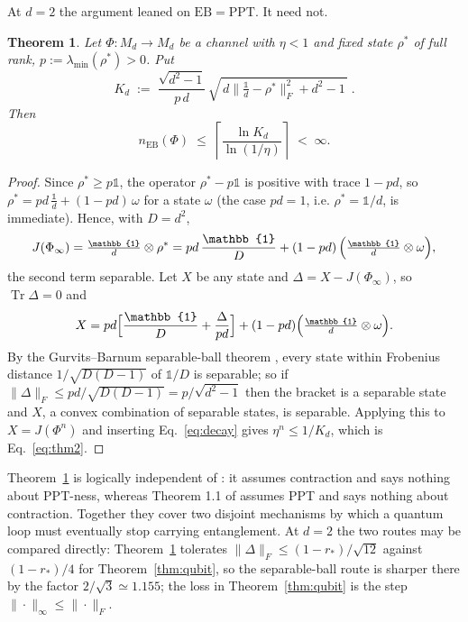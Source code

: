 \documentclass[11pt,a4paper]{article}
\newtheorem{theorem}{Theorem}[section]
\theoremstyle{definition}
\theoremstyle{remark}
\newcommand{\openone}{\mathbb{1}}%
\begin{document}
At $d=2$ the argument leaned on $\mathrm{EB}=\mathrm{PPT}$. It need not.

\begin{theorem}\label{thm:generald}
Let $\Phi:M_d\to M_d$ be a channel with $\eta<1$ and fixed state $\rho^\ast$ of
full rank, $p:=\lambda_{\min}(\rho^\ast)>0$. Put
\begin{equation}\label{eq:Kd}
  K_d \;:=\; \frac{\sqrt{d^{2}-1}}{p\,d}\,
    \sqrt{\,d\bigl\|\tfrac{\openone}{d}-\rho^\ast\bigr\|_F^{2}+d^{2}-1\,}\;.
\end{equation}
Then
\begin{equation}\label{eq:thm2}
  n_{\mathrm{EB}}(\Phi)\;\le\;
  \left\lceil \frac{\ln K_d}{\ln(1/\eta)} \right\rceil \;<\;\infty .
\end{equation}
\end{theorem}

\begin{proof}
Since $\rho^\ast\ge p\openone$, the operator $\rho^\ast-p\openone$ is positive
with trace $1-pd$, so $\rho^\ast=pd\,\tfrac{\openone}{d}+(1-pd)\,\omega$ for a
state $\omega$ (the case $pd=1$, i.e. $\rho^\ast=\openone/d$, is immediate).
Hence, with $D=d^{2}$,
\begin{equation}
  J(\Phi_\infty)=\tfrac{\openone}{d}\otimes\rho^\ast
  = pd\,\frac{\openone}{D}+(1-pd)\,\Bigl(\tfrac{\openone}{d}\otimes\omega\Bigr),
\end{equation}
the second term separable. Let $X$ be any state and
$\Delta=X-J(\Phi_\infty)$, so $\operatorname{Tr}\Delta=0$ and
\begin{equation}
  X = pd\Bigl[\frac{\openone}{D}+\frac{\Delta}{pd}\Bigr]
      +(1-pd)\Bigl(\tfrac{\openone}{d}\otimes\omega\Bigr).
\end{equation}
By the Gurvits--Barnum separable-ball theorem \cite{GurvitsBarnum02}, every
state within Frobenius distance $1/\sqrt{D(D-1)}$ of $\openone/D$ is separable;
so if $\|\Delta\|_F\le pd/\sqrt{D(D-1)}=p/\sqrt{d^{2}-1}$ then the bracket is a
separable state and $X$, a convex combination of separable states, is separable.
Applying this to $X=J(\Phi^{n})$ and inserting Eq.~\eqref{eq:decay} gives
$\eta^{n}\le 1/K_d$, which is Eq.~\eqref{eq:thm2}.
\end{proof}

Theorem~\ref{thm:generald} is logically independent of \cite{Park2026}: it
assumes contraction and says nothing about PPT-ness, whereas Theorem 1.1 of
\cite{Park2026} assumes PPT and says nothing about contraction. Together they
cover two disjoint mechanisms by which a quantum loop must eventually stop
carrying entanglement. At $d=2$ the two routes may be compared directly:
Theorem~\ref{thm:generald} tolerates
$\|\Delta\|_F\le(1-r_\ast)/\sqrt{12}$ against $(1-r_\ast)/4$ for
Theorem~\ref{thm:qubit}, so the separable-ball route is sharper there by the
factor $2/\sqrt3\simeq1.155$; the loss in Theorem~\ref{thm:qubit} is the
step $\|\cdot\|_\infty\le\|\cdot\|_F$.
\end{document}
